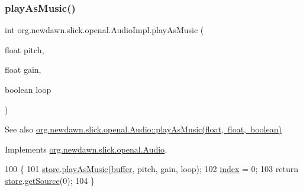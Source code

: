 \subsubsection{\texorpdfstring{play\+As\+Music()}{playAsMusic()}}
{\footnotesize\ttfamily int org.\+newdawn.\+slick.\+openal.\+Audio\+Impl.\+play\+As\+Music (\begin{DoxyParamCaption}\item[{float}]{pitch,  }\item[{float}]{gain,  }\item[{boolean}]{loop }\end{DoxyParamCaption})\hspace{0.3cm}{\ttfamily [inline]}}

\begin{DoxySeeAlso}{See also}
\mbox{\hyperlink{interfaceorg_1_1newdawn_1_1slick_1_1openal_1_1_audio_a9a13784b5ec9ce06c8756f98b00e05ab}{org.\+newdawn.\+slick.\+openal.\+Audio\+::play\+As\+Music(float, float, boolean)}} 
\end{DoxySeeAlso}


Implements \mbox{\hyperlink{interfaceorg_1_1newdawn_1_1slick_1_1openal_1_1_audio_a9a13784b5ec9ce06c8756f98b00e05ab}{org.\+newdawn.\+slick.\+openal.\+Audio}}.


\begin{DoxyCode}
100                                                                   \{
101         \mbox{\hyperlink{classorg_1_1newdawn_1_1slick_1_1openal_1_1_audio_impl_a1f616264ac2d6ec44cb0c187836d34f5}{store}}.\mbox{\hyperlink{classorg_1_1newdawn_1_1slick_1_1openal_1_1_sound_store_a1408e7b11a103ec98a66350073c89ffe}{playAsMusic}}(\mbox{\hyperlink{classorg_1_1newdawn_1_1slick_1_1openal_1_1_audio_impl_ac08b49601da30895fecfdca4e8ba0049}{buffer}}, pitch, gain, loop);
102         \mbox{\hyperlink{classorg_1_1newdawn_1_1slick_1_1openal_1_1_audio_impl_ab0e80c9c431d4b6c9b667012f7f71b86}{index}} = 0;
103         \textcolor{keywordflow}{return} \mbox{\hyperlink{classorg_1_1newdawn_1_1slick_1_1openal_1_1_audio_impl_a1f616264ac2d6ec44cb0c187836d34f5}{store}}.\mbox{\hyperlink{classorg_1_1newdawn_1_1slick_1_1openal_1_1_sound_store_a36b83b67fccef1cd5167d2ea11e89f6a}{getSource}}(0);
104     \}
\end{DoxyCode}
\mbox{\label{classorg_1_1newdawn_1_1slick_1_1openal_1_1_audio_impl_a731e0f7331c13b1c6507303ab875c6da}} 
